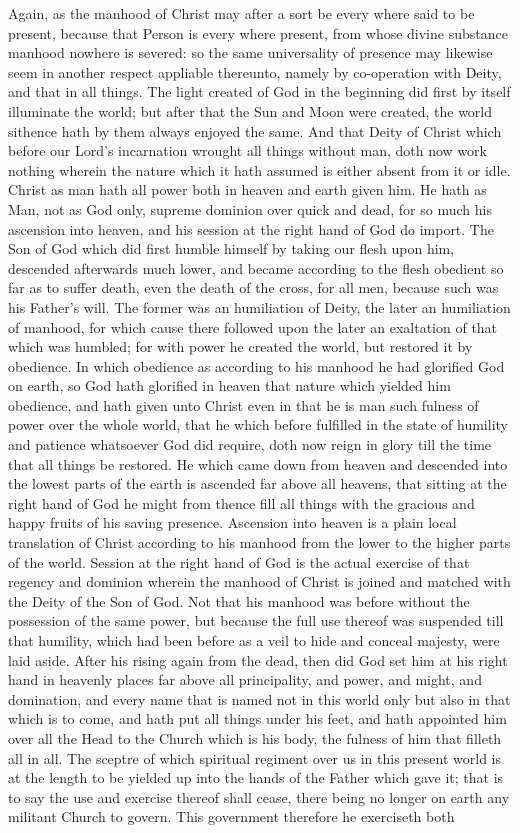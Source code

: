 Again, as the manhood of Christ may after a sort be every where said to be present, because that Person is every where present, from whose divine substance manhood nowhere is severed: so the same universality of presence may likewise seem in another respect appliable thereunto, namely by co-operation with Deity, and that in all things. The light created of God in the beginning did first by itself illuminate the world; but after that the Sun and Moon were created, the world sithence hath by them always enjoyed the same. And that Deity of Christ which before our Lord’s incarnation wrought all things without man, doth now work nothing wherein the nature which it hath assumed is either absent from it or idle. Christ as man hath all power both in heaven and earth given him. He hath as Man, not as God only, supreme dominion over quick and dead, for so much his ascension into heaven, and his session at the right hand of God do import. The Son of God which did first humble himself by taking our flesh upon him, descended afterwards much lower, and became according to the flesh obedient so far as to suffer death, even the death of the cross, for all men, because such was his Father’s will. The former was an humiliation of Deity, the later an humiliation of manhood, for which cause there  followed upon the later an exaltation of that which was humbled; for with power he created the world, but restored it by obedience. In which obedience as according to his manhood he had glorified God on earth, so God hath glorified in heaven that nature which yielded him obedience, and hath given unto Christ even in that he is man such fulness of power over the whole world, that he which before fulfilled in the state of humility and patience whatsoever God did require, doth now reign in glory till the time that all things be restored. He which came down from heaven and descended into the lowest parts of the earth is ascended far above all heavens, that sitting at the right hand of God he might from thence fill all things with the gracious and happy fruits of his saving presence. Ascension into heaven is a plain local translation of Christ according to his manhood from the lower to the higher parts of the world. Session at the right hand of God is the actual exercise of that regency and dominion wherein the manhood of Christ is joined and matched with the Deity of the Son of God. Not that his manhood was before without the possession of the same power, but because the full use thereof was suspended till that humility, which had been before as a veil to hide and conceal majesty, were laid aside. After his rising again from the dead, then did God set him at his right hand in heavenly places far above all principality, and power, and might, and domination, and every name that is named not in this world only but also in that which is to come, and hath put all things under his feet, and hath appointed him over all the Head to the Church which is his body, the fulness of him that filleth all in all. The sceptre of which spiritual regiment over us in this present world is at the length to be yielded up into the hands of the Father which gave it; that is to say the use and exercise thereof shall  cease, there being no longer on earth any militant Church to govern. This government therefore he exerciseth both 